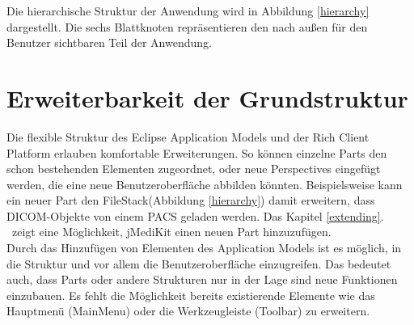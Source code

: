 Die hierarchische Struktur der Anwendung wird in Abbildung \ref{hierarchy} dargestellt. Die sechs Blattknoten repräsentieren den nach außen für den Benutzer sichtbaren Teil der Anwendung. 


\FloatBarrier
\section{Erweiterbarkeit der Grundstruktur} \label{hierarchyextending}
Die flexible Struktur des Eclipse Application Models und der Rich Client Platform erlauben komfortable Erweiterungen. So können einzelne Parts den schon bestehenden Elementen zugeordnet, oder neue Perspectives eingefügt werden, die eine neue Benutzeroberfläche abbilden könnten. Beispielsweise kann ein neuer Part den FileStack(Abbildung \ref{hierarchy}) damit erweitern, dass DICOM-Objekte von einem PACS geladen werden. Das Kapitel \glqq \ref{extending}. \grqq\ zeigt eine Möglichkeit, jMediKit einen neuen Part hinzuzufügen.\\
Durch das Hinzufügen von Elementen des Application Models ist es möglich, in die Struktur und vor allem die Benutzeroberfläche einzugreifen. Das bedeutet auch, dass Parts oder andere Strukturen nur in der Lage sind neue Funktionen einzubauen. Es fehlt die Möglichkeit bereits existierende Elemente wie das Hauptmenü (MainMenu) oder die Werkzeugleiste (Toolbar) zu erweitern.

